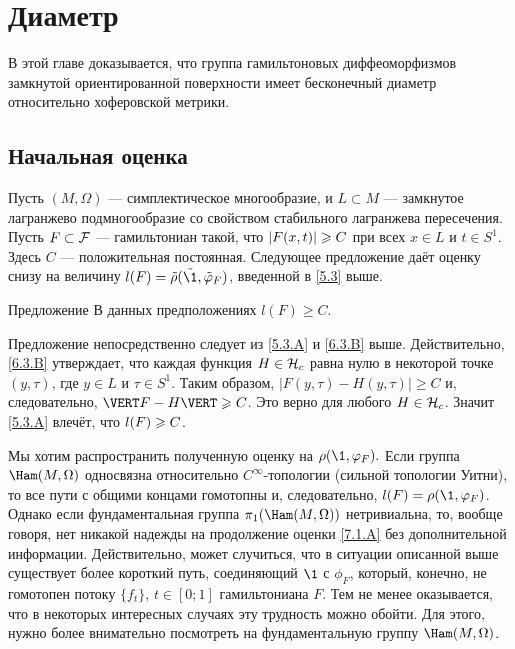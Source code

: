 \chapter{Диаметр}

В этой главе доказывается, что группа гамильтоновых диффеоморфизмов
замкнутой ориентированной поверхности имеет бесконечный диаметр
относительно хоферовской метрики. 

\section{Начальная оценка}
Пусть $(M, \Omega)$ --- симплектическое многообразие, и $L \subset M$
--- замкнутое лагранжево подмногообразие со свойством  стабильного
лагранжева пересечения. 
Пусть $F \subset \mathcal{F}$ --- гамильтониан такой, что $| F (x, t) | \z\ge C$ при всех $x \in L$ и $t \in S^1$.
Здесь $C$ --- положительная постоянная.
Следующее предложение даёт оценку снизу на величину $l (F) \z= \tilde\rho (\tilde\1, \tilde\phi_F)$, введенной в \ref{5.3} выше.

\begin{thm}{Предложение}\label{7.1.A}
В данных предположениях $l (F) \ge C$.
\end{thm}

Предложение непосредственно следует из \ref{5.3.A} и \ref{6.3.B} выше.
Действительно, \ref{6.3.B} утверждает, что каждая функция $H \in \mathcal{H}_c$ равна нулю в некоторой точке $(y, \tau)$, где $y \in L$ и $\tau \in S^1$.
Таким образом, $| F (y, \tau) - H (y, \tau) | \ge C$ и, следовательно, $\VERT F - H \VERT \z\ge C$.
Это верно для любого $H \in \mathcal{H}_c$.
Значит \ref{5.3.A} влечёт, что $l (F) \z\ge C$.
\qeds

Мы хотим распространить полученную оценку на $\rho (\1, \phi_F).$
Если группа $\Ham (M, \Omega)$ односвязна относительно $C^\infty$-топологии (сильной топологии Уитни), то все пути с общими концами гомотопны и, следовательно, $l (F) = \rho (\1, \phi_F)$.
Однако если фундаментальная группа $\pi_1 (\Ham (M, \Omega))$ нетривиальна, то, вообще говоря, нет никакой надежды на продолжение оценки \ref{7.1.A} без дополнительной информации.
Действительно, может случиться, что в ситуации описанной выше существует более короткий путь, соединяющий $\1$ с $\phi_F$, который, конечно, не гомотопен потоку $\{f_t\}$, $t \in [0; 1]$ гамильтониана $F$.
Тем не менее оказывается, что в некоторых интересных случаях эту трудность можно обойти.
Для этого, нужно более внимательно посмотреть на фундаментальную группу $\Ham (M, \Omega)$.


